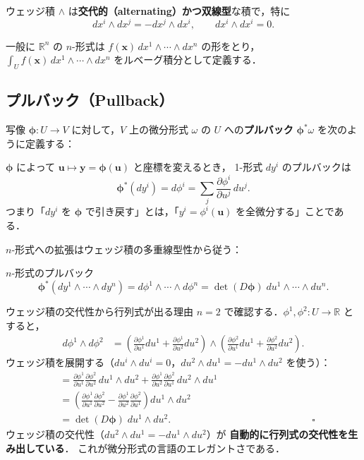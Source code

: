 \documentclass[lualatex,ja=standard,a4paper,12pt]{bxjsarticle}
\begin{document}
ウェッジ積 $\wedge$ は\textbf{交代的（alternating）かつ双線型}な積で，特に
\[
  dx^i \wedge dx^j = -dx^j \wedge dx^i, \qquad dx^i \wedge dx^i = 0.
\]

一般に $\mathbb{R}^n$ の $n$-形式は $f(\mathbf{x})\,dx^1 \wedge \cdots \wedge dx^n$ の形をとり，
$\int_U f(\mathbf{x})\,dx^1 \wedge \cdots \wedge dx^n$ をルベーグ積分として定義する．

\subsection{プルバック（Pullback）}

写像 $\boldsymbol{\phi}: U \to V$ に対して，$V$ 上の微分形式 $\omega$ の
$U$ への\textbf{プルバック} $\boldsymbol{\phi}^*\omega$ を次のように定義する：

$\boldsymbol{\phi}$ によって $\mathbf{u} \mapsto \mathbf{y} = \boldsymbol{\phi}(\mathbf{u})$ と座標を変えるとき，
1-形式 $dy^i$ のプルバックは
\[
  \boldsymbol{\phi}^*(dy^i) = d\phi^i = \sum_j \frac{\partial \phi^i}{\partial u^j}\,du^j.
\]
つまり「$dy^i$ を $\boldsymbol{\phi}$ で引き戻す」とは，「$y^i = \phi^i(\mathbf{u})$ を全微分する」ことである．

$n$-形式への拡張はウェッジ積の多重線型性から従う：

\begin{thmbox}{$n$-形式のプルバック}
\[
  \boldsymbol{\phi}^*(dy^1 \wedge \cdots \wedge dy^n)
  = d\phi^1 \wedge \cdots \wedge d\phi^n
  = \det(D\boldsymbol{\phi})\; du^1 \wedge \cdots \wedge du^n.
\]
\end{thmbox}

\begin{derivbox}{ウェッジ積の交代性から行列式が出る理由}
$n=2$ で確認する．$\phi^1, \phi^2: U \to \mathbb{R}$ とすると，
\begin{align*}
  d\phi^1 \wedge d\phi^2
  &= \left(\frac{\partial \phi^1}{\partial u^1}du^1 + \frac{\partial \phi^1}{\partial u^2}du^2\right)
     \wedge
     \left(\frac{\partial \phi^2}{\partial u^1}du^1 + \frac{\partial \phi^2}{\partial u^2}du^2\right).
\end{align*}
ウェッジ積を展開する（$du^i \wedge du^i = 0$，$du^2 \wedge du^1 = -du^1 \wedge du^2$ を使う）：
\begin{align*}
  &= \frac{\partial \phi^1}{\partial u^1}\frac{\partial \phi^2}{\partial u^2}\,du^1\wedge du^2
   + \frac{\partial \phi^1}{\partial u^2}\frac{\partial \phi^2}{\partial u^1}\,du^2\wedge du^1 \\
  &= \left(
      \frac{\partial \phi^1}{\partial u^1}\frac{\partial \phi^2}{\partial u^2}
     -\frac{\partial \phi^1}{\partial u^2}\frac{\partial \phi^2}{\partial u^1}
     \right) du^1\wedge du^2 \\
  &= \det(D\boldsymbol{\phi})\; du^1\wedge du^2. \hspace{6cm}\square
\end{align*}
ウェッジ積の交代性（$du^2 \wedge du^1 = -du^1\wedge du^2$）が
\textbf{自動的に行列式の交代性を生み出している}．
これが微分形式の言語のエレガントさである．
\end{derivbox}
\end{document}
